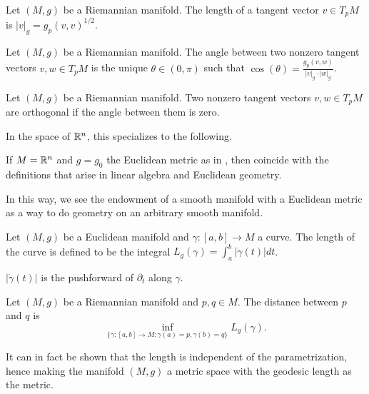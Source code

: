 \begin{definition}\label{def: length of tangent vector}
    Let $(M,g)$ be a Riemannian manifold. The length of a tangent vector $v\in T_{p}M$ is $|v|_{g}=g_{p}(v,v)^{1/2}$. 
\end{definition}
\begin{definition}\label{def: angle between tangent vectors}
    Let $(M,g)$ be a Riemannian manifold. The angle between two nonzero tangent vectors $v,w\in T_{p}M$ is the unique $\theta\in(0,\pi)$ such that $\cos(\theta)=\frac{g_{p}(v,w)}{|v|_{g}\cdot |w|_{g}}$. 
\end{definition}
\begin{definition}\label{def: orthogonal tangent vectors}
    Let $(M,g)$ be a Riemannian manifold. Two nonzero tangent vectors $v,w\in T_{p}M$ are orthogonal if the angle between them is zero. 
\end{definition}
In the space of $\mathbb{R}^{n}$, this specializes to the following. 
\begin{example}
    If $M=\mathbb{R}^{n}$ and $g=g_{0}$ the Euclidean metric as in , then  coincide with the definitions that arise in linear algebra and Euclidean geometry. 
\end{example}
In this way, we see the endowment of a smooth manifold with a Euclidean metric as a way to do geometry on an arbitrary smooth manifold. 
\begin{definition}\label{def: length of curve}
    Let $(M,g)$ be a Euclidean manifold and $\gamma:[a,b]\to M$ a curve. The length of the curve is defined to be the integral $L_{g}(\gamma)=\int_{a}^{b}|\dot{\gamma}(t)|dt$. 
\end{definition}
\begin{remark}
    $|\dot{\gamma}(t)|$ is the pushforward of $\partial_{t}$ along $\gamma$. 
\end{remark}
\begin{definition}\label{def: geodesic length}
    Let $(M,g)$ be a Riemannian manifold and $p,q\in M$. The distance between $p$ and $q$ is 
    $$\inf_{\{\gamma:[a,b]\to M:\gamma(a)=p,\gamma(b)=q\}}L_{g}(\gamma).$$
\end{definition}
It can in fact be shown that the length is independent of the parametrization, hence making the manifold $(M,g)$ a metric space with the geodesic length  as the metric. 

